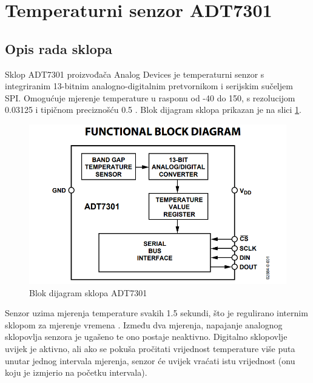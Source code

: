     \section{Temperaturni senzor ADT7301}

        \subsection{Opis rada sklopa}
            Sklop ADT7301 proizvođača Analog Devices je temperaturni senzor s integriranim 13-bitnim analogno-digitalnim pretvornikom i serijskim sučeljem SPI. Omogućuje mjerenje temperature u rasponu od -40\textcelsius{} do 150\textcelsius{}, s rezolucijom 0.03125\textcelsius{} i tipičnom preciznošću \textpm{} 0.5\textcelsius{} \cite{adt7301_datasheet}. Blok dijagram sklopa prikazan je na slici \ref{fig:adt7301_blok_dijagram}.
            
            \begin{figure}[htb]
                \centering
                \includegraphics{slike/ADT7301_blok_dijagram.png}
                \caption{Blok dijagram sklopa ADT7301 \cite{adt7301_datasheet}}
                \label{fig:adt7301_blok_dijagram}
            \end{figure}

            Senzor uzima mjerenja temperature svakih 1.5 sekundi, što je regulirano internim sklopom za mjerenje vremena . Između dva mjerenja, napajanje analognog sklopovlja senzora je ugašeno te ono postaje neaktivno. Digitalno sklopovlje uvijek je aktivno, ali ako se pokuša pročitati vrijednost temperature više puta unutar jednog intervala mjerenja, senzor će uvijek vraćati istu vrijednost (onu koju je izmjerio na početku intervala).
            
